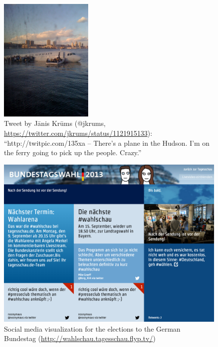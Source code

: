 \begin{figure}[!ht]
  \centering
  \includegraphics[height=6cm]{plane_hudson_river.jpg}
  \caption[Tweet by J\=anis Kr\=ums]
    {Tweet by J\=anis Kr\=ums (@jkrums, \url{https://twitter.com/jkrums/status/1121915133}): ``http://twitpic.com/135xa -- There's a plane in the Hudson. I'm on the ferry going to pick up the people. Crazy.''}
  \label{fig:plane-hudson}
\end{figure}

\begin{figure}[!ht]
  \centering
  \includegraphics[width=0.95\linewidth]{wahlschau}
  \caption[Social media visualization for the elections to the German Bundestag]
    {Social media visualization for the elections to the German Bundestag (\url{http://wahlschau.tagesschau.flyp.tv/})}
  \label{fig:wahlschau}
\end{figure}

